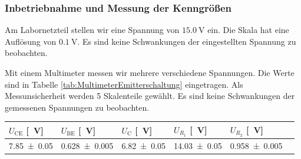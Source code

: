\subsubsection*{Inbetriebnahme und Messung der Kenngrößen}
%
Am Labornetzteil stellen wir eine Spannung von $\SI{15,0}{\volt}$ ein.
Die Skala hat eine Auflösung von $\SI{0,1}{\volt}$.
Es sind keine Schwankungen der eingestellten Spannung zu beobachten.
%
\par
%
Mit einem Multimeter messen wir mehrere verschiedene Spannungen.
Die Werte sind in Tabelle \ref{tab:MultimeterEmitterschaltung} eingetragen.
Als Messunsicherheit werden 5 Skalenteile gewählt.
Es sind keine Schwankungen der gemessenen Spannungen zu beobachten.
%
\par
%
\minipage{\linewidth}
    \begin{center}
        \captionsetup{type=table}
        \begin{adjustbox}{max width=\linewidth, keepaspectratio}
            \begin{tabular}{llllll}
            \toprule
            $U_{\text{CE}}$ [\SI{}{\volt}] & $U_{\text{BE}}$ [\SI{}{\volt}] & $U_{\text{C}}$ [\SI{}{\volt}] & $U_{R_1}$ [\SI{}{\volt}] & $U_{R_2}$ [\SI{}{\volt}] \\
            \midrule
            \SI{7,85 \pm 0,05}{}           & \SI{0,628 \pm 0,005}{}         & \SI{6,82 \pm 0,05}{}          & \SI{14,03 \pm 0,05}{}    & \SI{0,958 \pm 0,005}{}   \\
            \bottomrule
            \end{tabular}
        \end{adjustbox}
        \label{tab:MultimeterEmitterschaltung}
    \end{center}
\endminipage
%
